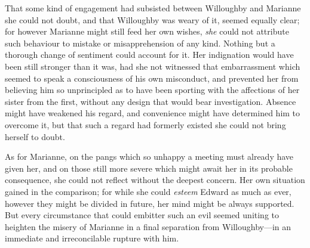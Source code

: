 That some kind of engagement had subsisted between Willoughby and Marianne she could not doubt, and that Willoughby was weary of it, seemed equally clear; for however Marianne might still feed her own wishes, \textit{she} could not attribute such behaviour to mistake or misapprehension of any kind. Nothing but a thorough change of sentiment could account for it. Her indignation would have been still stronger than it was, had she not witnessed that embarrassment which seemed to speak a consciousness of his own misconduct, and prevented her from believing him so unprincipled as to have been sporting with the affections of her sister from the first, without any design that would bear investigation. Absence might have weakened his regard, and convenience might have determined him to overcome it, but that such a regard had formerly existed she could not bring herself to doubt.

As for Marianne, on the pangs which so unhappy a meeting must already have given her, and on those still more severe which might await her in its probable consequence, she could not reflect without the deepest concern. Her own situation gained in the comparison; for while she could \textit{esteem} Edward as much as ever, however they might be divided in future, her mind might be always supported. But every circumstance that could embitter such an evil seemed uniting to heighten the misery of Marianne in a final separation from Willoughby—in an immediate and irreconcilable rupture with him.